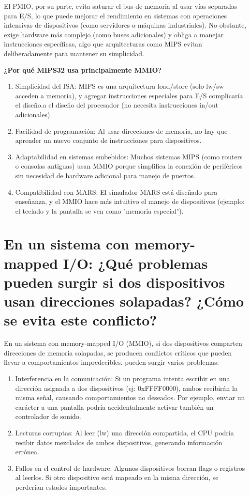 \documentclass{article}
\begin{document}
El PMIO, por su parte, evita saturar el bus de memoria al usar vías separadas para E/S, lo que puede mejorar el rendimiento en sistemas con operaciones intensivas de dispositivos (como servidores o máquinas industriales). No obstante, exige hardware más complejo (como buses adicionales) y obliga a manejar instrucciones específicas, algo que arquitecturas como MIPS evitan deliberadamente para mantener su simplicidad.\newline

\textbf{¿Por qué MIPS32 usa principalmente MMIO?}
\begin{enumerate}
\item Simplicidad del ISA: MIPS es una arquitectura load/store (solo lw/sw acceden a memoria), y agregar instrucciones especiales para E/S complicaría el diseño.a el diseño del procesador (no necesita instrucciones in/out adicionales).
\item Facilidad de programación: Al usar direcciones de memoria, no hay que aprender un nuevo conjunto de instrucciones para dispositivos.
\item Adaptabilidad en sistemas embebidos: Muchos sistemas MIPS (como routers o consolas antiguas) usan MMIO porque simplifica la conexión de periféricos sin necesidad de hardware adicional para manejo de puertos.
\item Compatibilidad con MARS: El simulador MARS está diseñado para enseñanza, y el MMIO hace más intuitivo el manejo de dispositivos (ejemplo: el teclado y la pantalla se ven como "memoria especial").
\end{enumerate}

\section{En un sistema con memory-mapped I/O: ¿Qué problemas pueden surgir si dos 
dispositivos usan direcciones solapadas? ¿Cómo se evita este conflicto?}

En un sistema con memory-mapped I/O (MMIO), si dos dispositivos comparten direcciones de memoria solapadas, se producen conflictos críticos que pueden llevar a comportamientos impredecibles. pueden surgir varios problemas:
\begin{enumerate}
\item Interferencia en la comunicación: Si un programa intenta escribir en una dirección asignada a dos dispositivos (ej: 0xFFFF0000), ambos recibirán la misma señal, causando comportamientos no deseados. Por ejemplo, enviar un carácter a una pantalla podría accidentalmente activar también un controlador de sonido.
\item Lecturas corruptas: Al leer (lw) una dirección compartida, el CPU podría recibir datos mezclados de ambos dispositivos, generando información errónea.
\item Fallos en el control de hardware: Algunos dispositivos borran flags o registros al leerlos. Si otro dispositivo está mapeado en la misma dirección, se perderían estados importantes.
\end{enumerate}
\end{document}
